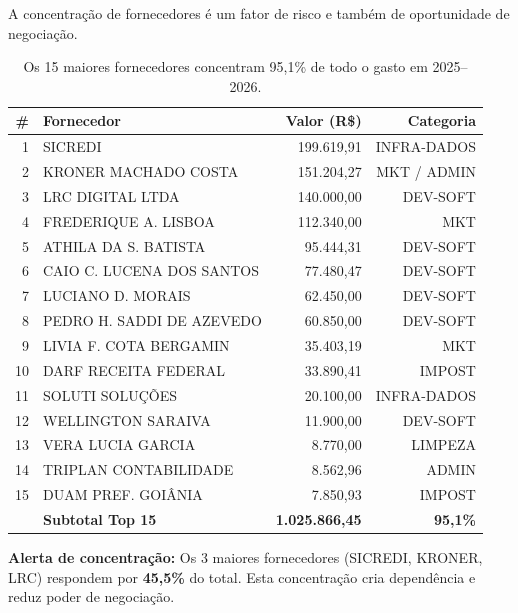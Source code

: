 \documentclass[12pt, a4paper]{article}
\begin{document}
A concentração de fornecedores é um fator de risco e também de oportunidade de negociação.

\begin{table}[H]
    \centering
    \small
    \renewcommand{\arraystretch}{1.3}
    \begin{tabularx}{\textwidth}{r X r r}
        \toprule
        \rowcolor{tableHeader} \textbf{\#} & \textbf{Fornecedor} & \textbf{Valor (R\$)} & \textbf{Categoria} \\
        \midrule
        1 & SICREDI & 199.619,91 & INFRA-DADOS \\
        2 & KRONER MACHADO COSTA & 151.204,27 & MKT / ADMIN \\
        3 & LRC DIGITAL LTDA & 140.000,00 & DEV-SOFT \\
        4 & FREDERIQUE A. LISBOA & 112.340,00 & MKT \\
        5 & ATHILA DA S. BATISTA & 95.444,31 & DEV-SOFT \\
        6 & CAIO C. LUCENA DOS SANTOS & 77.480,47 & DEV-SOFT \\
        7 & LUCIANO D. MORAIS & 62.450,00 & DEV-SOFT \\
        8 & PEDRO H. SADDI DE AZEVEDO & 60.850,00 & DEV-SOFT \\
        9 & LIVIA F. COTA BERGAMIN & 35.403,19 & MKT \\
        10 & DARF RECEITA FEDERAL & 33.890,41 & IMPOST \\
        11 & SOLUTI SOLUÇÕES & 20.100,00 & INFRA-DADOS \\
        12 & WELLINGTON SARAIVA & 11.900,00 & DEV-SOFT \\
        13 & VERA LUCIA GARCIA & 8.770,00 & LIMPEZA \\
        14 & TRIPLAN CONTABILIDADE & 8.562,96 & ADMIN \\
        15 & DUAM PREF. GOIÂNIA & 7.850,93 & IMPOST \\
        \midrule
        \rowcolor{lightGray} & \textbf{Subtotal Top 15} & \textbf{1.025.866,45} & \textbf{95,1\%} \\
        \bottomrule
    \end{tabularx}
    \caption*{\footnotesize Os 15 maiores fornecedores concentram 95,1\% de todo o gasto em 2025--2026.}
\end{table}

\textcolor{accentColor}{\textbf{Alerta de concentração:}} Os 3 maiores fornecedores (SICREDI, KRONER, LRC) respondem por \textbf{45,5\%} do total. Esta concentração cria dependência e reduz poder de negociação.
\end{document}
